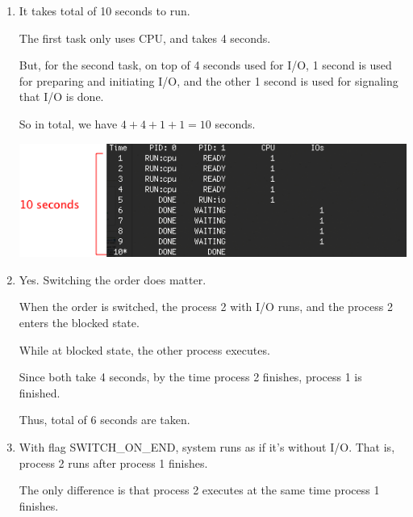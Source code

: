 \documentclass[12pt]{article}
\begin{document}
\begin{enumerate}[1.]
    \item

    It takes total of 10 seconds to run.

    \bigskip

    The first task only uses CPU, and takes 4 seconds.

    \bigskip

    But, for the second task, on top of 4 seconds used for I/O, 1 second is used for preparing and initiating I/O,
    and the other 1 second is used for signaling that I/O is done.

    \bigskip

    So in total, we have $4 + 4 + 1 + 1 = 10$ seconds.

    \begin{center}
    \includegraphics[width=\linewidth]{images/worksheet_1_solution_1.png}
    \end{center}

    \item

    Yes. Switching the order does matter.

    \bigskip

    When the order is switched, the process 2 with I/O runs, and the process 2 enters
    the blocked state.

    \bigskip

    While at blocked state, the other process executes.

    \bigskip

    Since both take 4 seconds, by the time process 2 finishes, process 1 is finished.

    \bigskip

    Thus, total of 6 seconds are taken.

    \item

    With flag SWITCH\_ON\_END, system runs as if it's without I/O. That is,
    process 2 runs after process 1 finishes.

    \bigskip

    The only difference is that process 2 executes at the same time process 1 finishes.


\end{enumerate}
\end{document}
